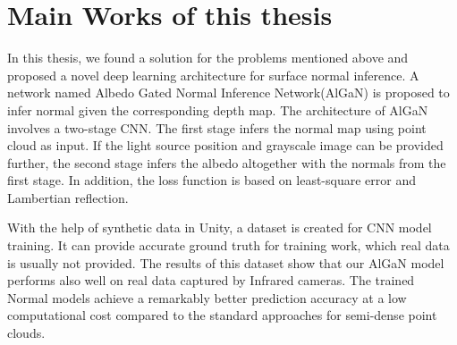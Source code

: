 \section{Main Works of this thesis}
In this thesis, we found a solution for the problems mentioned above and proposed a novel deep learning architecture for surface normal inference. A network named Albedo Gated Normal Inference Network(AlGaN) is proposed to infer normal given the corresponding depth map. The architecture of AlGaN involves a two-stage CNN. The first stage infers the normal map using point cloud as input. If the light source position and grayscale image can be provided further, the second stage infers the albedo altogether with the normals from the first stage. In addition, the loss function is based on least-square error and Lambertian reflection.

With the help of synthetic data in Unity, a dataset is created for CNN model training. It can provide accurate ground truth for training work, which real data is usually not provided. The results of this dataset show that our AlGaN model performs also well on real data captured by Infrared cameras. The trained Normal models achieve a remarkably better prediction accuracy at a low computational cost compared to the standard approaches for semi-dense point clouds. 